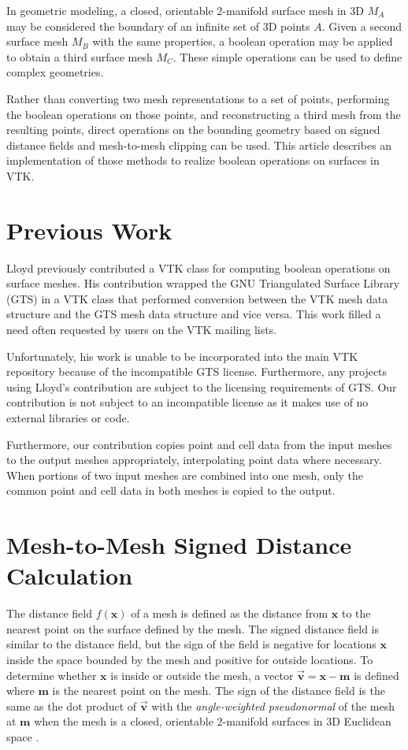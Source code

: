 \documentclass{InsightArticle}
\def\x{{\mathbf x}}
\def\m{{\mathbf m}}
\def\v{{\overrightarrow{\mathbf v}}}
\begin{document}
In geometric modeling, a closed, orientable 2-manifold surface mesh in 3D $M_A$ may be considered the boundary of an infinite set of 3D points $A$. Given a second surface mesh $M_B$ with the same properties, a boolean operation may be applied to obtain a third surface mesh $M_C$. These simple operations can be used to define complex geometries.

Rather than converting two mesh representations to a set of points, performing the boolean operations on those points, and reconstructing a third mesh from the resulting points, direct operations on the bounding geometry based on signed distance fields and mesh-to-mesh clipping can be used. This article describes an implementation of those methods to realize boolean operations on surfaces in VTK.

\section{Previous Work}

Lloyd previously contributed a VTK class for computing boolean operations on surface meshes. His contribution wrapped the GNU Triangulated Surface Library (GTS) in a VTK class that performed conversion between the VTK mesh data structure and the GTS mesh data structure and vice versa. This work filled a need often requested by users on the VTK mailing lists.

Unfortunately, his work is unable to be incorporated into the main VTK repository because of the  incompatible GTS license. Furthermore, any projects using Lloyd's contribution are subject to the licensing requirements of GTS. Our contribution is not subject to an incompatible license as it makes use of no external libraries or code.

Furthermore, our contribution copies point and cell data from the input meshes to the output meshes appropriately, interpolating point data where necessary. When portions of two input meshes are combined into one mesh, only the common point and cell data in both meshes is copied to the output.

\section{Mesh-to-Mesh Signed Distance Calculation}

The distance field $f(\x)$ of a mesh is defined as the distance from $\x$ to the nearest point on the surface defined by the mesh. The signed distance field is similar to the distance field, but the sign of the field is negative for locations $\x$ inside the space bounded by the mesh and positive for outside locations. To determine whether $\x$ is inside or outside the mesh, a vector $\v = \x - \m$ is defined where $\m$ is the nearest point on the mesh. The sign of the distance field is the same as the dot product of $\v$ with the \emph{angle-weighted pseudonormal} of the mesh at $\m$ when the mesh is a closed, orientable 2-manifold surfaces in 3D Euclidean space \cite{Baerentzen2005}.  
\end{document}
